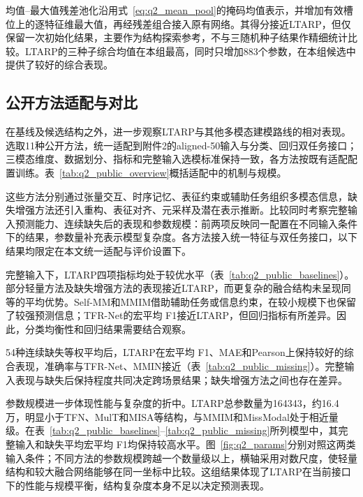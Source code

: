 \documentclass[UTF8,a4paper,11pt]{ctexart}
\newcommand{\QTwoParagraph}{\par\noindent\hspace*{2em}}
\newcounter{q2algorithm}
\begin{document}
\QTwoParagraph 均值--最大值残差池化沿用式~\eqref{eq:q2_mean_pool}的掩码均值表示，并增加有效槽位上的逐特征维最大值，再经残差组合接入原有网络。其得分接近LTARP，但仅保留一次初始化结果，主要作为结构探索参考，不与三随机种子结果作精细统计比较。LTARP的三种子综合均值在本组最高，同时只增加883个参数，在本组候选中提供了较好的综合表现。
\FloatBarrier

\subsection{公开方法适配与对比}\label{subsec:q2_public}
\QTwoParagraph 在基线及候选结构之外，进一步观察LTARP与其他多模态建模路线的相对表现。选取11种公开方法，统一适配到附件2的aligned-50输入与分类、回归双任务接口；三模态维度、数据划分、指标和完整输入选模标准保持一致，各方法按既有适配配置训练。表~\ref{tab:q2_public_overview}概括适配中的机制与规模。



\QTwoParagraph 这些方法分别通过张量交互、时序记忆、表征约束或辅助任务组织多模态信息，缺失增强方法还引入重构、表征对齐、元采样及潜在表示推断。比较同时考察完整输入预测能力、连续缺失后的表现和参数规模：前两项反映同一配置在不同输入条件下的结果，参数量补充表示模型复杂度。各方法接入统一特征与双任务接口，以下结果均限定在本文统一适配与评价设置下。

\QTwoParagraph 完整输入下，LTARP四项指标均处于较优水平（表~\ref{tab:q2_public_baselines}）。部分轻量方法及缺失增强方法的表现接近LTARP，而更复杂的融合结构未呈现同等的平均优势。Self-MM和MMIM借助辅助任务或信息约束，在较小规模下也保留了较强预测信息；TFR-Net的宏平均 F1接近LTARP，但回归指标有所差异。因此，分类均衡性和回归结果需要结合观察。



\QTwoParagraph 54种连续缺失等权平均后，LTARP在宏平均 F1、MAE和Pearson上保持较好的综合表现，准确率与TFR-Net、MMIN接近（表~\ref{tab:q2_public_missing}）。完整输入表现与缺失后保持程度共同决定跨场景结果；缺失增强方法之间也存在差异。


\FloatBarrier

\QTwoParagraph 参数规模进一步体现性能与复杂度的折中。LTARP总参数量为164343，约16.4万，明显小于TFN、MulT和MISA等结构，与MMIM和MissModal处于相近量级。在表~\ref{tab:q2_public_baselines}--\ref{tab:q2_public_missing}所列模型中，其完整输入和缺失平均宏平均 F1均保持较高水平。图~\ref{fig:q2_params}分别对照这两类输入条件；不同方法的参数规模跨越一个数量级以上，横轴采用对数尺度，使轻量结构和较大融合网络能够在同一坐标中比较。这组结果体现了LTARP在当前接口下的性能与规模平衡，结构复杂度本身不足以决定预测表现。
\end{document}
